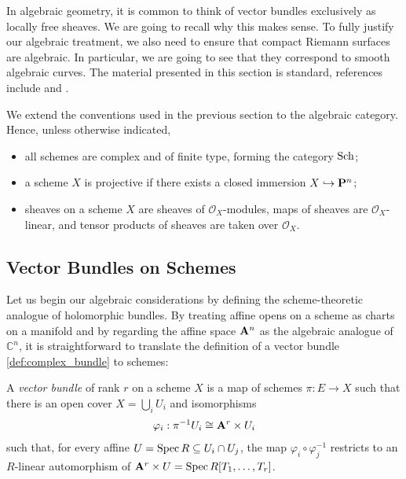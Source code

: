 \documentclass[12pt]{ociamthesis}  %
\begin{document}
In algebraic geometry, it is common to think of vector bundles
exclusively as locally free sheaves. We are going to recall
why this makes sense. To fully justify our algebraic treatment,
we also need to ensure that compact Riemann surfaces are algebraic.
In particular, we are going to see that they correspond to 
smooth algebraic curves. The material presented in this section
is standard, references include \cite{gortz2010} and
\cite{hartshorne1977}.

We extend the conventions used in the previous section to the
algebraic category. Hence, unless otherwise indicated,
\begin{itemize}
  \item all schemes are complex and of finite type, forming
        the category $\operatorname{Sch}$;
  \item a scheme $X$ is projective if there exists a closed
        immersion $X\hookrightarrow\mathbf{P}^{n}_{}$;
  \item sheaves on a scheme $X$ are sheaves of $\mathscr O_X$-modules,
        maps of sheaves are $\mathscr O_X$-linear, and tensor products
        of sheaves are taken over $\mathscr O_X$.
\end{itemize}

\subsection{Vector Bundles on Schemes}

Let us begin our algebraic considerations by defining the scheme-theoretic
analogue of holomorphic bundles. By treating affine opens on a scheme as charts on a manifold
and by regarding the affine space $\mathbf{A}^{n}_{}$ as the algebraic
analogue of $\mathbb C^n$, it is straightforward to translate
the definition of a vector bundle \ref{def:complex_bundle} to schemes:

\begin{definition}
  \label{def:vector_bundle}
  A \emph{vector bundle} of rank $r$ on a scheme $X$ is
  a map of schemes $\pi : E \to X$ such that there is an open
  cover $X = \bigcup_i U_i$ and isomorphisms
  \begin{align}\label{eq:trivialisation}
    \varphi_i : {\pi}^{-1}U_i \cong \mathbf{A}^{r}_{}\times U_i
  \end{align}
  such that, for every affine $U = \operatorname{Spec} R \subseteq U_i \cap U_j$,
  the map $\varphi_i \circ \varphi^{-1}_j$ restricts to an $R$-linear
  automorphism of $\mathbf{A}^{r}_{}\times U = \operatorname{Spec} R[T_1,\ldots,T_r]$.
\end{definition}
\end{document}
